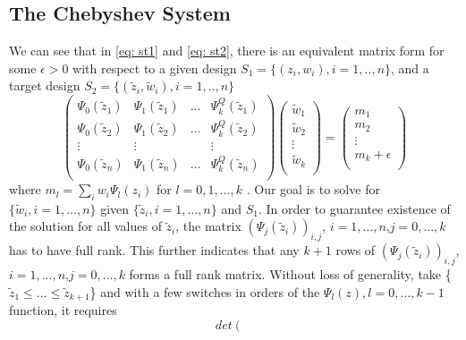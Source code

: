\documentclass[11pt]{amsart}
\theoremstyle{definition}
\theoremstyle{remark}
\begin{document}
\subsection{The Chebyshev System}
We can see that in \eqref{eq: st1} and \eqref{eq: st2},  there is an equivalent matrix form for some $\epsilon>0$ with respect to a given design $S_1 = \{(z_i, w_i), i=1,..,n\} $, and a target design  $S_2 = \{(\tilde{z}_i, \tilde{w}_i), i=1,..,n\}$
\begin{equation}\label{eq: tsys1}
\left ( \begin{array}{cccc}

\Psi_{0}(\tilde{z}_1) &\Psi_{1}(\tilde{z}_1)&\ldots &\Psi_{k}^Q(\tilde{z}_1)\\
\Psi_{0}(\tilde{z}_2) &\Psi_{1}(\tilde{z}_2)&\ldots &\Psi_{k}^Q(\tilde{z}_2)\\
\vdots & \vdots &&\vdots\\
\Psi_{0}(\tilde{z}_n) &\Psi_{1}(\tilde{z}_n)&\ldots &\Psi_{k}^Q(\tilde{z}_n)\\
\end{array}\right) \left(\begin{array}{c}
  \tilde{w}_1    \\
   \tilde{w}_2    \\
   \vdots\\
    \tilde{w}_k    \\
      
\end{array}\right) = \left(\begin{array}{c}
  m_1    \\
   m_2    \\
   \vdots\\
    m_k+\epsilon    \\
      
\end{array}\right) 
\end{equation} where $m_l = \sum_{i}w_i\Psi_l(z_i)$ for $l=0,1,\ldots,k$ . Our goal is to solve for $\{\tilde{w}_i, i=1,\ldots,n\}$ given $\{\tilde{z}_i, i=1,\ldots,n\}$ and $S_1$. In order to guarantee existence of the solution for all values of $\tilde{z}_i$, the matrix $\left(\Psi_j(\tilde{z}_i)\right)_{i,j}$, $i=1,\ldots,n$,$j=0,...,k$ has to have full rank. This further indicates that any $k+1$ rows of $\left(\Psi_j(\tilde{z}_i)\right)_{i,j}$, $i=1,\ldots,n$,$j=0,...,k$ forms a full rank matrix. Without loss of generality, take \{$\tilde{z}_1 \le \ldots\le\tilde{z}_{k+1} $\} and with a few switches in orders of the $\Psi_l(z), l=0,\ldots, k-1$ function, it requires\[det\left ( \begin{array}{cccc}\label{eq: tdef1}


\end{array}\]
\end{document}
